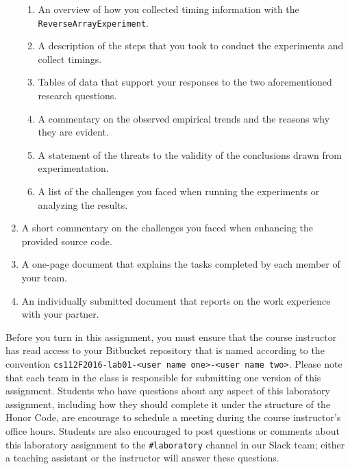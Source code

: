 \begin{enumerate}
    \vspace*{-.05in}
    \begin{enumerate}
      \itemsep 0em
      \item An overview of how you collected timing information with the {\tt ReverseArrayExperiment}.
      \item A description of the steps that you took to conduct the experiments and collect timings.
      \item Tables of data that support your responses to the two aforementioned research questions.
      \item A commentary on the observed empirical trends and the reasons why they are evident.
      \item A statement of the threats to the validity of the conclusions drawn from experimentation.
      \item A list of the challenges you faced when running the experiments or analyzing the results.
    \end{enumerate}

  \item A short commentary on the challenges you faced when enhancing the provided source code.

  \item A one-page document that explains the tasks completed by each member of your team.

  \item An individually submitted document that reports on the work experience with your partner.

\end{enumerate}

\vspace*{-.05in}

Before you turn in this assignment, you must ensure that the course instructor has read access to your Bitbucket
repository that is named according to the convention {\tt cs112F2016-lab01-<user name one>-<user name two>}. Please note
that each team in the class is responsible for submitting one version of this assignment. Students who have questions
about any aspect of this laboratory assignment, including how they should complete it under the structure of the Honor
Code, are encourage to schedule a meeting during the course instructor's office hours. Students are also encouraged to
post questions or comments about this laboratory assignment to the {\tt \#laboratory} channel in our Slack team; either
a teaching assistant or the instructor will answer these questions.


